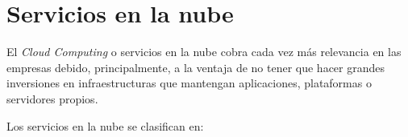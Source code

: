 






\section{Servicios en la nube}

El \emph{Cloud Computing} o servicios en la nube cobra cada vez más relevancia en las empresas debido, principalmente, a la ventaja de no tener que hacer grandes inversiones en infraestructuras que mantengan aplicaciones, plataformas o servidores propios.

Los servicios en la nube se clasifican en:

